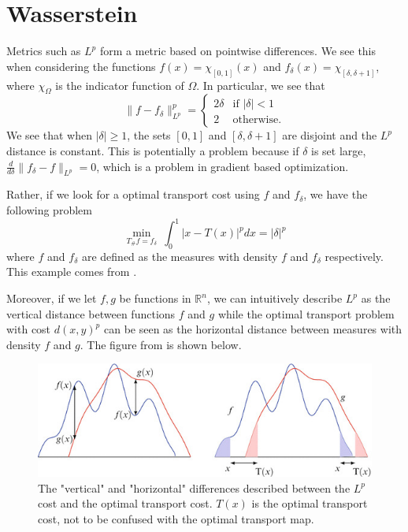 \documentclass[12pt]{article}
\newcommand{\R}{\mathbb{R}}
\theoremstyle{plain}
\numberwithin{equation}{section}
\begin{document}
\section{Wasserstein}

Metrics such as $L^p$ form a metric based on pointwise differences. We see this when considering the functions $f(x)=\chi_{[0,1]}(x)$ and $f_\delta(x) = \chi_{[\delta,\delta+1]}$, where $\chi_\Omega$ is the indicator function of $\Omega$.
In particular, we see that 
\[\|f-f_\delta\|_{L^p}^p = \begin{cases} 2\delta &\text{if $|\delta| < 1$} \\
2 &\text{otherwise.}\end{cases}\]
We see that when $|\delta| \ge 1$, the sets $[0,1]$ and $[\delta,\delta+1]$ are disjoint and the $L^p$ distance is constant. This is potentially a problem because if $\delta$ is set large, $\frac{d}{d\delta}\|f_\delta - f \|_{L^p} = 0$, which is a problem in gradient based optimization.

Rather, if we look for a optimal transport cost using $f$ and $f_\delta$, we have the following problem 
\[\min_{T_\#f = f_\delta}\ \int_0^1|x-T(x)|^pdx = |\delta|^p\]
where $f$ and $f_\delta$ are defined as the measures with density $f$ and $f_\delta$ respectively. This example comes from \cite{thorpe}.

Moreover, if we let $f,g$ be functions in $\R^n$, we can intuitively describe $L^p$ as the vertical distance between functions $f$ and $g$ while the optimal transport problem with cost $d(x,y)^p$ can be seen as the horizontal distance between measures with density $f$ and $g$. The figure from \cite{santambrogio} is shown below.
\begin{figure}[H]
  \center
  \includegraphics[scale=0.6]{wasserstein_lp.jpg}
  \caption{The "vertical" and "horizontal" differences described between the $L^p$ cost and the optimal transport cost. $T(x)$ is the optimal transport cost, not to be confused with the optimal transport map.}
\end{figure}
\end{document}
